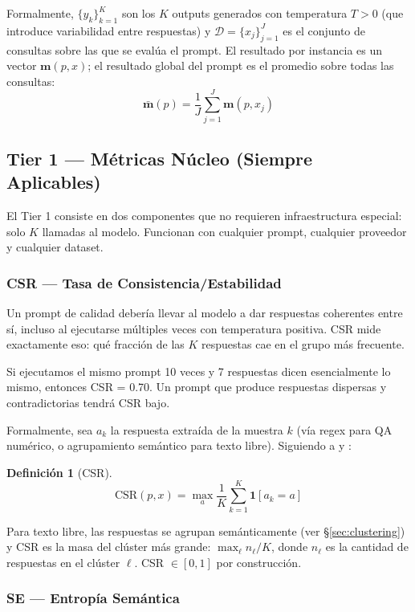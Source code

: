 \documentclass[11pt,a4paper]{article}
\newtheorem{definition}{Definición}
\begin{document}
Formalmente, $\{y_k\}_{k=1}^{K}$ son los $K$ outputs generados con temperatura $T > 0$ (que introduce variabilidad entre respuestas) y $\mathcal{D} = \{x_j\}_{j=1}^{J}$ es el conjunto de consultas sobre las que se evalúa el prompt. El resultado por instancia es un vector $\mathbf{m}(p, x)$; el resultado global del prompt es el promedio sobre todas las consultas:
\[
\bar{\mathbf{m}}(p) = \frac{1}{J} \sum_{j=1}^{J} \mathbf{m}(p, x_j)
\]

\subsection{Tier 1 --- Métricas Núcleo (Siempre Aplicables)}

El Tier 1 consiste en dos componentes que no requieren infraestructura especial: solo $K$ llamadas al modelo. Funcionan con cualquier prompt, cualquier proveedor y cualquier dataset.

\subsubsection{CSR --- Tasa de Consistencia/Estabilidad}

Un prompt de calidad debería llevar al modelo a dar respuestas coherentes entre sí, incluso al ejecutarse múltiples veces con temperatura positiva. CSR mide exactamente eso: qué fracción de las $K$ respuestas cae en el grupo más frecuente.

Si ejecutamos el mismo prompt 10 veces y 7 respuestas dicen esencialmente lo mismo, entonces CSR = 0.70. Un prompt que produce respuestas dispersas y contradictorias tendrá CSR bajo.

Formalmente, sea $a_k$ la respuesta extraída de la muestra $k$ (vía regex para QA numérico, o agrupamiento semántico para texto libre). Siguiendo a \citet{selfconsistency2023} y \citet{glape2024}:

\begin{definition}[CSR]
\[
\mathrm{CSR}(p, x) = \max_{a} \frac{1}{K} \sum_{k=1}^{K} \mathbf{1}[a_k = a]
\]
\end{definition}

Para texto libre, las respuestas se agrupan semánticamente (ver \S\ref{sec:clustering}) y CSR es la masa del clúster más grande: $\max_{\ell} n_\ell / K$, donde $n_\ell$ es la cantidad de respuestas en el clúster $\ell$. CSR $\in [0, 1]$ por construcción.

\subsubsection{SE --- Entropía Semántica}
\end{document}
